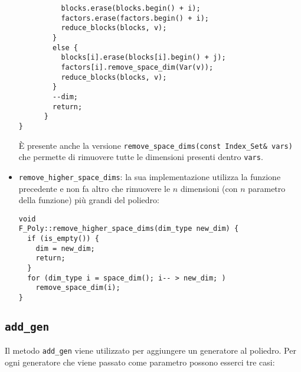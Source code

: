 \documentclass{mimosis}
\theoremstyle{definition}
\begin{document}
\begin{itemize}
\begin{lstlisting}
          blocks.erase(blocks.begin() + i);
          factors.erase(factors.begin() + i);
          reduce_blocks(blocks, v);
        }
        else {
          blocks[i].erase(blocks[i].begin() + j);
          factors[i].remove_space_dim(Var(v));
          reduce_blocks(blocks, v);
        }
        --dim;
        return;
      }
}
\end{lstlisting}
È presente anche la versione \texttt{remove\_space\_dims(const Index\_Set\& vars)} che
permette di rimuovere tutte le dimensioni presenti dentro \texttt{vars}.
\item \texttt{remove\_higher\_space\_dims}: la sua implementazione utilizza la funzione
precedente e non fa altro che rimuovere le \(n\) dimensioni (con \(n\) parametro
della funzione) più grandi del poliedro:
\lstset{style=mystyle,language=C++,label= ,caption= ,captionpos=b,numbers=none}
\begin{lstlisting}
void
F_Poly::remove_higher_space_dims(dim_type new_dim) {
  if (is_empty()) {
    dim = new_dim;
    return;
  }
  for (dim_type i = space_dim(); i-- > new_dim; )
    remove_space_dim(i);
}
\end{lstlisting}
\end{itemize}

\subsection{\texttt{add\_gen}}
\label{sec:orgb0f510c}
Il metodo \texttt{add\_gen} viene utilizzato per aggiungere un generatore al poliedro.
Per ogni generatore che viene passato come parametro possono esserci tre casi:
\end{document}
